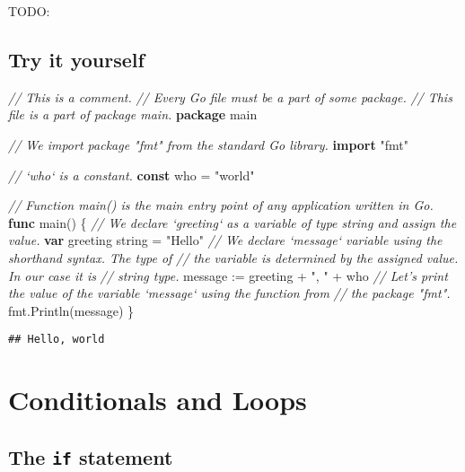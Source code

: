 \documentclass[]{book}
\newenvironment{Shaded}{\begin{snugshade}}{\end{snugshade}}
\newcommand{\CommentTok}[1]{\textcolor[rgb]{0.56,0.35,0.01}{\textit{#1}}}
\newcommand{\DataTypeTok}[1]{\textcolor[rgb]{0.13,0.29,0.53}{#1}}
\newcommand{\KeywordTok}[1]{\textcolor[rgb]{0.13,0.29,0.53}{\textbf{#1}}}
\newcommand{\NormalTok}[1]{#1}
\newcommand{\StringTok}[1]{\textcolor[rgb]{0.31,0.60,0.02}{#1}}
\begin{document}
TODO:

\hypertarget{try-it-yourself}{%
\section*{Try it yourself}\label{try-it-yourself}}

\begin{Shaded}
\begin{Highlighting}[]
\CommentTok{// This is a comment.}
\CommentTok{// Every Go file must be a part of some package.}
\CommentTok{// This file is a part of package main.}
\KeywordTok{package}\NormalTok{ main}

\CommentTok{// We import package "fmt" from the standard Go library.}
\KeywordTok{import} \StringTok{"fmt"}

\CommentTok{// `who` is a constant.}
\KeywordTok{const}\NormalTok{ who = }\StringTok{"world"}

\CommentTok{// Function main() is the main entry point of any application written in Go.}
\KeywordTok{func}\NormalTok{ main() \{}
    \CommentTok{// We declare `greeting` as a variable of type string and assign the value.}
    \KeywordTok{var}\NormalTok{ greeting }\DataTypeTok{string}\NormalTok{ = }\StringTok{"Hello"}
    \CommentTok{// We declare `message` variable using the shorthand syntax. The type of}
    \CommentTok{// the variable is determined by the assigned value. In our case it is}
    \CommentTok{// string type.}
\NormalTok{    message := greeting + }\StringTok{", "}\NormalTok{ + who}
    \CommentTok{// Let's print the value of the variable `message` using the function from}
    \CommentTok{// the package "fmt".}
\NormalTok{    fmt.Println(message)}
\NormalTok{\}}
\end{Highlighting}
\end{Shaded}

\begin{verbatim}
## Hello, world
\end{verbatim}

\hypertarget{conditionals-and-loops}{%
\chapter{Conditionals and Loops}\label{conditionals-and-loops}}

\hypertarget{the-if-statement}{%
\section{\texorpdfstring{The \texttt{if} statement}{The if statement}}\label{the-if-statement}}
\end{document}
